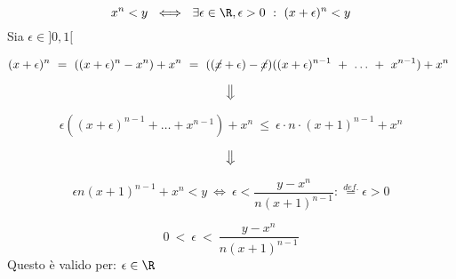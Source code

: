 \begin{dimo}[$x^n < y$]

	\begin{equation}
	x^n < y \ \iff\ \exists\epsilon \in \R, 
	\epsilon > 0 \ :\ (x + \epsilon)^n < y
	\end{equation}
Sia $\epsilon \in ]0,1[$

	\begin{equation}
	(x + \epsilon)^n\ =\ ((x + \epsilon)^n - x^n) + x^n\ =\
	((\cancel{x} + \epsilon)- \cancel{x})((x+ \epsilon)^{n-1}\ +\	
	\dots\ +\ x^{n-1}) + x^n\
	\end{equation}
	
	\begin{equation}
	\big\Downarrow
	\end{equation}

	\begin{equation}
	\epsilon ( (x + \epsilon)^{n-1} + \dots + x^{n-1}) + x^n\ \leq\
	\epsilon \cdot n \cdot (x + 1)^{n-1} + x^n
	\end{equation}

	\begin{equation}
	\big\Downarrow
	\end{equation}
	
	\begin{equation}
	\epsilon n (x+1)^{n-1} + x^n < y \ \iff\ 
	\epsilon < \frac{y - x^n}{n(x+1)^{n-1}} : \overset{def.}{=} \epsilon > 0
	\end{equation}

	\begin{equation}
	0\ <\ \epsilon\ <\ \frac{y - x^n}{n(x+1)^{n-1}} 	
	\end{equation}
Questo è valido per: $ \epsilon \in \R $ 

		
\end{dimo}

